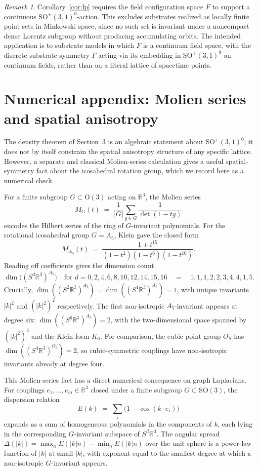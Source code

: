 \documentclass[11pt]{article}
\theoremstyle{remark}
\newtheorem*{remark}{Remark}
\begin{document}
\begin{remark}
Corollary~\ref{cor:lp} requires the field configuration space $F$ to
support a continuous $\mathrm{SO}^+(3,1)^0$-action. This excludes
substrates realized as locally finite point sets in Minkowski space,
since no such set is invariant under a noncompact dense Lorentz
subgroup without producing accumulating orbits. The intended
application is to substrate models in which $F$ is a continuum field
space, with the discrete substrate symmetry $\Gamma$ acting via its
embedding in $\mathrm{SO}^+(3,1)^0$ on continuum fields, rather than
on a literal lattice of spacetime points.
\end{remark}


\section{Numerical appendix: Molien series and spatial anisotropy}

The density theorem of Section~3 is an algebraic statement about
$\mathrm{SO}^+(3,1)^0$; it does not by itself constrain the spatial
anisotropy structure of any specific lattice. However, a separate and
classical Molien-series calculation gives a useful spatial-symmetry
fact about the icosahedral rotation group, which we record here as a
numerical check.

For a finite subgroup $G \subset \mathrm{O}(3)$ acting on
$\mathbb{R}^3$, the Molien series
\[
  M_G(t) \;=\; \frac{1}{|G|} \sum_{g \in G} \frac{1}{\det(1 - tg)}
\]
encodes the Hilbert series of the ring of $G$-invariant polynomials.
For the rotational icosahedral group $G = A_5$, Klein \cite{Klein1884}
gave the closed form
\[
  M_{A_5}(t) \;=\; \frac{1 + t^{15}}{(1 - t^2)(1 - t^6)(1 - t^{10})}.
\]
Reading off coefficients gives the dimension count
\[
  \dim\bigl((S^d \mathbb{R}^3)^{A_5}\bigr) \quad
  \text{for } d = 0, 2, 4, 6, 8, 10, 12, 14, 15, 16
  \quad = \quad 1, 1, 1, 2, 2, 3, 4, 4, 1, 5.
\]
Crucially, $\dim((S^2 \mathbb{R}^3)^{A_5}) = \dim((S^4
\mathbb{R}^3)^{A_5}) = 1$, with unique invariants $|k|^2$ and
$(|k|^2)^2$ respectively. The first non-isotropic $A_5$-invariant
appears at degree six: $\dim((S^6 \mathbb{R}^3)^{A_5}) = 2$, with the
two-dimensional space spanned by $(|k|^2)^3$ and the Klein form $K_6$.
For comparison, the cubic point group $O_h$ has $\dim((S^4
\mathbb{R}^3)^{O_h}) = 2$, so cubic-symmetric couplings have
non-isotropic invariants already at degree four.

This Molien-series fact has a direct numerical consequence on graph
Laplacians. For couplings $e_1, \dots, e_m \in \mathbb{R}^3$ closed
under a finite subgroup $G \subset \mathrm{SO}(3)$, the dispersion
relation
\[
  E(k) \;=\; \sum_i \bigl(1 - \cos(k \cdot e_i)\bigr)
\]
expands as a sum of homogeneous polynomials in the components of $k$,
each lying in the corresponding $G$-invariant subspace of $S^d
\mathbb{R}^3$. The angular spread $\Delta(|k|) = \max_n E(|k| n) -
\min_n E(|k| n)$ over the unit sphere is a power-law function of
$|k|$ at small $|k|$, with exponent equal to the smallest degree at
which a non-isotropic $G$-invariant appears.
\end{document}
